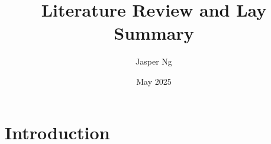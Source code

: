 \documentclass{article}
\title{Literature Review and Lay Summary}
\author{Jasper Ng}
\date{May 2025}
\begin{document}
\maketitle

\section{Introduction}
\end{document}
